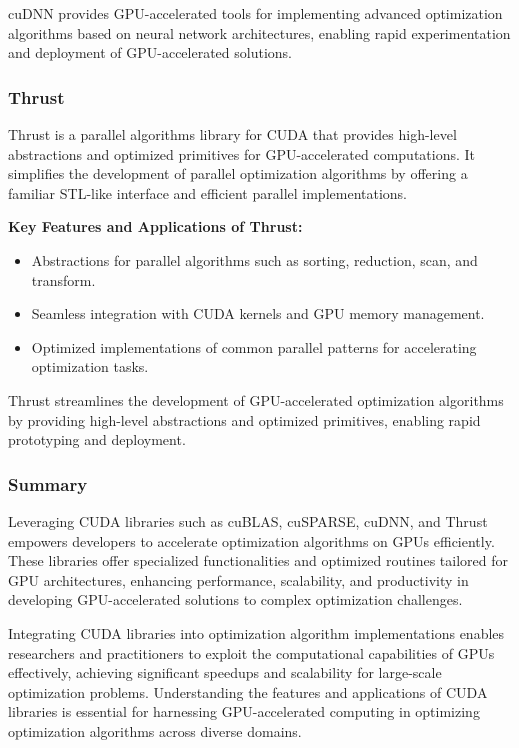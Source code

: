 \documentclass[11pt]{report}
\begin{document}
        cuDNN provides GPU-accelerated tools for implementing advanced optimization algorithms based on neural network architectures, enabling rapid experimentation and deployment of GPU-accelerated solutions.
        
        \subsubsection{Thrust}
        Thrust is a parallel algorithms library for CUDA that provides high-level abstractions and optimized primitives for GPU-accelerated computations. It simplifies the development of parallel optimization algorithms by offering a familiar STL-like interface and efficient parallel implementations.
        
        \textbf{Key Features and Applications of Thrust:}
        \begin{itemize}
            \item Abstractions for parallel algorithms such as sorting, reduction, scan, and transform.
        
            \item Seamless integration with CUDA kernels and GPU memory management.
        
            \item Optimized implementations of common parallel patterns for accelerating optimization tasks.
        \end{itemize}
        
        Thrust streamlines the development of GPU-accelerated optimization algorithms by providing high-level abstractions and optimized primitives, enabling rapid prototyping and deployment.

        \subsubsection{Summary}
        Leveraging CUDA libraries such as cuBLAS, cuSPARSE, cuDNN, and Thrust empowers developers to accelerate optimization algorithms on GPUs efficiently. These libraries offer specialized functionalities and optimized routines tailored for GPU architectures, enhancing performance, scalability, and productivity in developing GPU-accelerated solutions to complex optimization challenges.
        
        Integrating CUDA libraries into optimization algorithm implementations enables researchers and practitioners to exploit the computational capabilities of GPUs effectively, achieving significant speedups and scalability for large-scale optimization problems. Understanding the features and applications of CUDA libraries is essential for harnessing GPU-accelerated computing in optimizing optimization algorithms across diverse domains.
\end{document}
